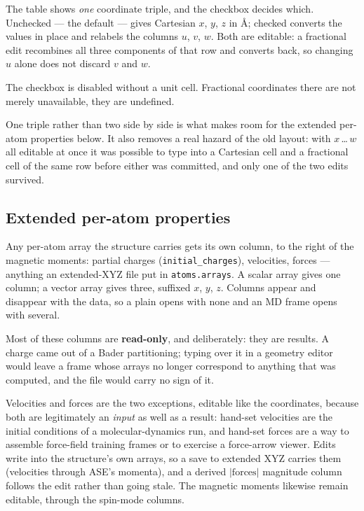 The table shows \emph{one} coordinate triple, and the  checkbox decides which. Unchecked --- the default --- gives
Cartesian $x$, $y$, $z$ in \AA; checked converts the values in place and
relabels the columns $u$, $v$, $w$. Both are editable: a fractional edit
recombines all three components of that row and converts back, so changing $u$
alone does not discard $v$ and $w$.

The checkbox is disabled without a unit cell. Fractional coordinates there are
not merely unavailable, they are undefined.

\begin{calnote}
One triple rather than two side by side is what makes room for the extended
per-atom properties below. It also removes a real hazard of the old layout:
with $x$\,\ldots\,$w$ all editable at once it was possible to type into a
Cartesian cell and a fractional cell of the same row before either was
committed, and only one of the two edits survived.
\end{calnote}

\subsection{Extended per-atom properties}
\label{sec:extxyz-columns}

Any per-atom array the structure carries gets its own column, to the right of
the magnetic moments: partial charges (\texttt{initial\_charges}), velocities,
forces --- anything an extended-XYZ file put in \texttt{atoms.arrays}. A
scalar array gives one column; a vector array gives three, suffixed $x$, $y$,
$z$. Columns appear and disappear with the data, so a plain  opens
with none and an MD frame opens with several.

Most of these columns are \textbf{read-only}, and deliberately: they are
results. A charge came out of a Bader partitioning; typing over it in a
geometry editor would leave a frame whose arrays no longer correspond to
anything that was computed, and the file would carry no sign of it.

Velocities and forces are the two exceptions, editable like the coordinates,
because both are legitimately an \emph{input} as well as a result: hand-set
velocities are the initial conditions of a molecular-dynamics run, and
hand-set forces are a way to assemble force-field training frames or to
exercise a force-arrow viewer. Edits write into the structure's own arrays,
so a save to extended XYZ carries them (velocities through ASE's momenta),
and a derived $|\mathrm{forces}|$ magnitude column follows the edit rather
than going stale. The magnetic moments likewise remain editable, through the
spin-mode columns.

